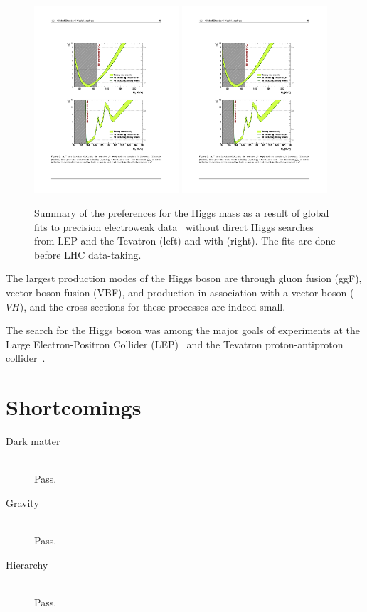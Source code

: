 \begin{figure}[tp]
  \centering
  \includegraphics[width=0.48\textwidth]{figures/standardmodel/gfitter_standardfit}
  \includegraphics[width=0.48\textwidth]{figures/standardmodel/gfitter_completefit}
  \caption{Summary of the preferences for the Higgs mass as a result of global fits to precision electroweak data~\cite{2009.gfitter} without direct Higgs searches from LEP and the Tevatron (left) and with (right). The fits are done before LHC data-taking.}
  \label{fig:sm-gfitter}
\end{figure}

The largest production modes of the Higgs boson are through gluon fusion (ggF), vector boson fusion (VBF), and production in association with a vector boson ($VH$), and the cross-sections for these processes are indeed small. 

The search for the Higgs boson was among the major goals of experiments at the Large Electron-Positron Collider (LEP)~\cite{2003.lep-higgs} and the Tevatron proton-antiproton collider~\cite{2013.tevatron-higgs}.

\section{Shortcomings}

\begin{description}
    \item[Dark matter] \hfill \\
      Pass.
    \item[Gravity]     \hfill \\
      Pass.
    \item[Hierarchy]   \hfill \\
      Pass.
\end{description}

